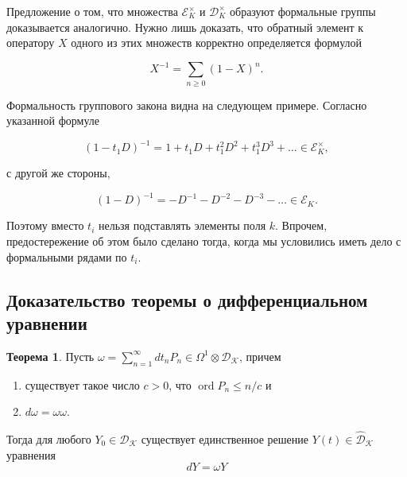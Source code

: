 \documentclass{article}
\theoremstyle{definition}
\newtheorem{theorem}{Теорема}[section]
\theoremstyle{definition} %
\theoremstyle{remark}     %
\theoremstyle{definition}
\theoremstyle{definition}
\theoremstyle{definition}
\theoremstyle{definition}
\theoremstyle{definition}
\theoremstyle{definition}
\theoremstyle{definition}
\theoremstyle{definition}
\begin{document}
Предложение о том, что множества \( \mathcal{E}_K^\times \) и \( \mathcal{D}_K^\times \) образуют формальные группы доказывается аналогично. Нужно лишь доказать, что обратный элемент к оператору \( X \) одного из этих множеств корректно определяется формулой

\[
X^{-1} = \sum_{n \geq 0} (1 - X)^n.
\]

Формальность группового закона видна на следующем примере. Согласно указанной формуле

\[
(1 - t_1 D)^{-1} = 1 + t_1 D + t_1^2 D^2 + t_1^3 D^3 + \dots \in \mathcal{E}_K^\times,
\]

с другой же стороны,

\[
(1 - D)^{-1} = -D^{-1} - D^{-2} - D^{-3} - \dots \in \mathcal{E}_K.
\]

Поэтому вместо \( t_i \) нельзя подставлять элементы поля \( k \). Впрочем, предостережение об этом было сделано тогда, когда мы условились иметь дело с формальными рядами по \( t_i \).




\subsection{Доказательство теоремы о дифференциальном уравнении}


\begin{theorem}
  Пусть \( \omega = \sum_{n=1}^\infty dt_n P_n \in \Omega^1 \otimes \mathcal{D_\mathcal{K}} \), причем
  \begin{enumerate}
    \item существует такое число \( c > 0 \), что \(\operatorname{ord} P_n \le n/c\) и
    \item \( d\omega = \omega\omega \).
  \end{enumerate}
  Тогда для любого \( Y_0 \in \mathcal{D_\mathcal{K}} \) существует единственное решение \( Y(t) \in \hat{\mathcal{D}}_\mathcal{K} \) уравнения
  \begin{equation*}\label{eq:D}
    dY = \omega Y \tag{D}
  \end{equation*}
\end{theorem}
\end{document}

